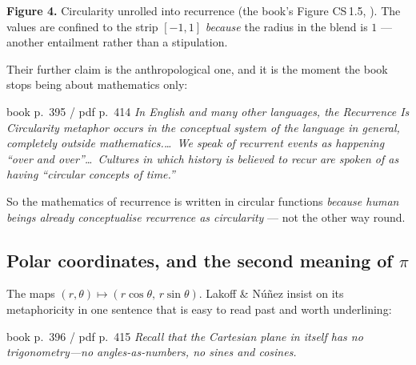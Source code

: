 \vspace{-8pt}
\begin{center}\begin{minipage}{0.93\textwidth}\footnotesize\color{slate}
\textbf{Figure 4.}\; Circularity unrolled into recurrence (the book's Figure CS\,1.5,
). The values are confined to the strip $[-1,1]$ \emph{because} the radius in the blend
is $1$ --- another entailment rather than a stipulation.
\end{minipage}\end{center}

\noindent Their further claim is the anthropological one, and it is the moment the book stops being
about mathematics only:

\begin{bookquote}{book p.~395 / pdf p.~414}
\textit{In English and many other languages, the Recurrence Is Circularity metaphor occurs in the
conceptual system of the language in general, completely outside mathematics.\ldots\ We speak of
recurrent events as happening ``over and over''\ldots\ Cultures in which history is believed to
recur are spoken of as having ``circular concepts of time.''}
\end{bookquote}

\noindent So the mathematics of recurrence is written in circular functions \emph{because human
beings already conceptualise recurrence as circularity} --- not the other way round.

\subsection{Polar coordinates, and the second meaning of \texorpdfstring{$\pi$}{pi}}

The  maps $(r,\theta)\mapsto(r\cos\theta,\,r\sin\theta)$. Lakoff
\& Núñez insist on its metaphoricity in one sentence that is easy to read past and worth underlining:

\begin{bookquote}{book p.~396 / pdf p.~415}
\textit{Recall that the Cartesian plane in itself has no trigonometry---no angles-as-numbers, no
sines and cosines.}
\end{bookquote}

